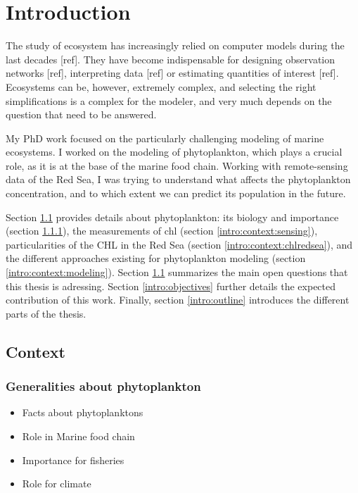 

\chapter{Introduction}
\label{intro}


The study of ecosystem has increasingly relied on computer models during the last decades [ref]. They have become indispensable for designing observation networks [ref], interpreting data [ref] or estimating quantities of interest [ref]. Ecosystems can be, however, extremely complex, and selecting the right simplifications is a complex for the modeler, and very much depends on the question that need to be answered. 

My PhD work focused on the particularly challenging modeling of marine ecosystems. I worked on the modeling of phytoplankton, which plays a crucial role, as it is at the base of the marine food chain. Working with remote-sensing data of the Red Sea, I was trying to understand what affects the phytoplankton concentration, and to which extent we can predict its population in the future. 

Section \ref{intro:context} provides details about phytoplankton: its biology and importance (section \ref{intro:context:generalities}), the measurements of chl (section \ref{intro:context:sensing}), particularities of the CHL in the Red Sea (section \ref{intro:context:chlredsea}), and the different approaches existing for phytoplankton modeling (section \ref{intro:context:modeling}). Section \ref{intro:context} summarizes the main open questions that this thesis is adressing. Section \ref{intro:objectives} further details the expected contribution of this work. Finally, section \ref{intro:outline} introduces the different parts of the thesis. 

\section{Context}
\label{intro:context}

	\subsection{Generalities about phytoplankton}
	\label{intro:context:generalities}

		\begin{itemize}
			\item Facts about phytoplanktons
			\item Role in Marine food chain
			\item Importance for fisheries
			\item Role for climate
		\end{itemize}

